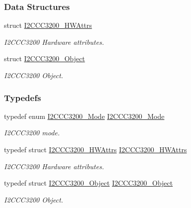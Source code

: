 \subsubsection*{Data Structures}
\begin{DoxyCompactItemize}
\item 
struct \hyperlink{struct_i2_c_c_c3200___h_w_attrs}{I2\+C\+C\+C3200\+\_\+\+H\+W\+Attrs}
\begin{DoxyCompactList}\small\item\em I2\+C\+C\+C3200 Hardware attributes. \end{DoxyCompactList}\item 
struct \hyperlink{struct_i2_c_c_c3200___object}{I2\+C\+C\+C3200\+\_\+\+Object}
\begin{DoxyCompactList}\small\item\em I2\+C\+C\+C3200 Object. \end{DoxyCompactList}\end{DoxyCompactItemize}
\subsubsection*{Typedefs}
\begin{DoxyCompactItemize}
\item 
typedef enum \hyperlink{_i2_c_c_c3200_8h_aecba715487712a8b525074b7b93e940b}{I2\+C\+C\+C3200\+\_\+\+Mode} \hyperlink{_i2_c_c_c3200_8h_a3e7a8af39ebe4372d43cbcbd760e5ab6}{I2\+C\+C\+C3200\+\_\+\+Mode}
\begin{DoxyCompactList}\small\item\em I2\+C\+C\+C3200 mode. \end{DoxyCompactList}\item 
typedef struct \hyperlink{struct_i2_c_c_c3200___h_w_attrs}{I2\+C\+C\+C3200\+\_\+\+H\+W\+Attrs} \hyperlink{_i2_c_c_c3200_8h_a684a95a71c6d653f099add355c43a1dd}{I2\+C\+C\+C3200\+\_\+\+H\+W\+Attrs}
\begin{DoxyCompactList}\small\item\em I2\+C\+C\+C3200 Hardware attributes. \end{DoxyCompactList}\item 
typedef struct \hyperlink{struct_i2_c_c_c3200___object}{I2\+C\+C\+C3200\+\_\+\+Object} \hyperlink{_i2_c_c_c3200_8h_aa8410656ed73821e36a81fd1e4c083a8}{I2\+C\+C\+C3200\+\_\+\+Object}
\begin{DoxyCompactList}\small\item\em I2\+C\+C\+C3200 Object. \end{DoxyCompactList}\end{DoxyCompactItemize}
